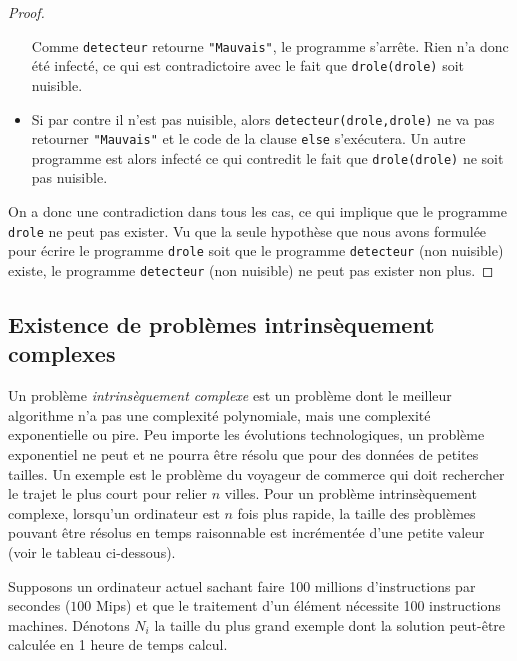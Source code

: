 \begin{proof}
\begin{itemize}
      Comme \lstinline|detecteur| retourne \lstinline|"Mauvais"|,
      le programme s'arrête.
      Rien n'a donc été infecté, ce qui est contradictoire avec le fait que \lstinline|drole(drole)| soit nuisible.
	\item Si par contre il n'est pas nuisible, alors \lstinline|detecteur(drole,drole)|
      ne va pas retourner \lstinline|"Mauvais"| et le code de la clause \lstinline|else| s'exécutera.
      Un autre programme est alors infecté ce qui contredit le fait que \lstinline|drole(drole)| ne soit pas nuisible.
\end{itemize}

On a donc une contradiction dans tous les cas, ce qui implique que le programme \lstinline|drole| ne peut pas
exister. Vu que la seule hypothèse que nous avons formulée pour écrire le programme \lstinline|drole| soit que le programme \lstinline|detecteur| (non nuisible) existe,
le programme \lstinline|detecteur| (non nuisible) ne peut pas exister non plus.
\end{proof}

\subsection{Existence de problèmes intrinsèquement complexes}
\label{subsec:existence_de_problemes_intrinsequement_complexes}

\begin{mydef}
	Un problème \emph{intrinsèquement complexe} est un problème dont le meilleur algorithme n'a pas une complexité polynomiale, mais une complexité exponentielle ou pire. Peu importe les évolutions technologiques, un problème exponentiel ne peut et ne pourra être résolu que pour des données de petites tailles.  Un exemple est le problème du voyageur de commerce qui doit rechercher le trajet le plus court pour relier $n$ villes. Pour un problème intrinsèquement complexe, lorsqu'un ordinateur est $n$ fois plus rapide, la taille des problèmes pouvant être résolus en temps raisonnable est incrémentée d'une petite valeur (voir le tableau ci-dessous).
\end{mydef}

Supposons un ordinateur actuel sachant faire 100 millions d'instructions par secondes ($100$ Mips) et que le traitement d'un élément nécessite 100 instructions machines. Dénotons $N_i$  la taille du \og plus grand\fg{} exemple dont la solution peut-être calculée en 1 heure de temps calcul.

